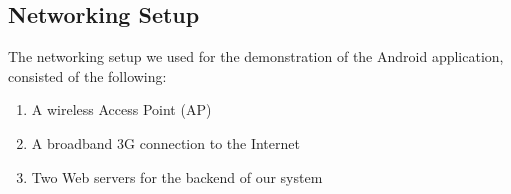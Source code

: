 \documentclass[conference]{IEEEtran}
\begin{document}
\subsection{Networking Setup}
The networking setup we used for the demonstration of the Android application, consisted of the following:
\begin{enumerate}
\item
A wireless Access Point (AP)
\item
A broadband 3G connection to the Internet
\item
Two Web servers for the backend of our system
\end{enumerate}




\begin{figure}[!t]
\begin{center}
\centering
{}
\hspace{0.2\columnwidth}
\end{center}
\end{figure}
\end{document}
